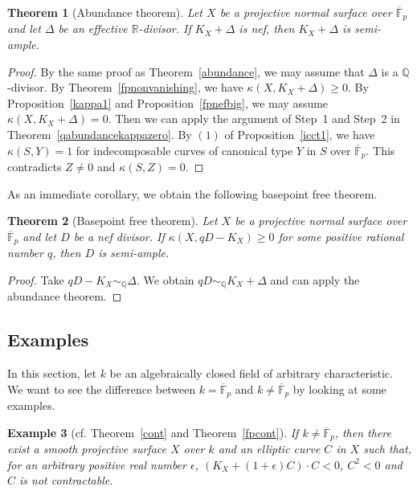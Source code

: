 \documentclass[12pt,twoside]{amsart}
\newtheorem{thm}{Theorem}[section]
\newtheorem{ex}[thm]{Example}
\theoremstyle{definition}
\newcommand{\Q}{$\mathbb{Q}$}
\newcommand{\fff}{\overline{\mathbb{F}}_p}
\begin{document}
\begin{thm}[Abundance theorem]\label{fpabundance}
Let $X$ be a projective normal surface over $\overline{\mathbb{F}}_p$ and 
let $\Delta$ be an effective $\mathbb{R}$-divisor.
If $K_X+\Delta$ is nef, then $K_X+\Delta$ is semi-ample. 
\end{thm}

\begin{proof}
By the same proof as Theorem~\ref{abundance}, 
we may assume that $\Delta$ is a \Q-divisor. 
By Theorem~\ref{fpnonvanishing}, we have $\kappa(X, K_X+\Delta)\geq 0$. 
By Proposition~\ref{kappa1} and Proposition~\ref{fpnefbig}, 
we may assume $\kappa(X, K_X+\Delta)=0$. 
Then we can apply the argument 
of Step~1 and Step~2 in Theorem~\ref{qabundancekappazero}. 
By $(1)$ of Proposition~\ref{icct1}, 
we have $\kappa(S, Y)=1$ for indecomposable curves of canonical type $Y$
in $S$ over $\overline{\mathbb{F}}_p$. 
This contradicts $Z\neq0$ and $\kappa(S, Z)=0$.
\end{proof}

As an immediate corollary, 
we obtain the following basepoint free theorem.

\begin{thm}[Basepoint free theorem]\label{fpbpf}
Let $X$ be a projective normal surface over $\overline{\mathbb{F}}_p$ and 
let $D$ be a nef divisor. 
If $\kappa(X, qD-K_X) \geq 0$ for some positive rational number $q$, 
then $D$ is semi-ample. 
\end{thm}

\begin{proof}
Take $qD-K_X \sim_{\mathbb{Q}} \Delta$.
We obtain $qD \sim_{\mathbb{Q}} K_X+\Delta$ 
and can apply the abundance theorem.
\end{proof}


\subsection{Examples}

In this section, 
let $k$ be an algebraically closed field of arbitrary characteristic. 
We want to see the difference 
between $k=\overline{\mathbb{F}}_p$ and $k\neq \overline{\mathbb{F}}_p$ 
by looking at some examples. 

\begin{ex}[cf. Theorem~\ref{cont} and Theorem~\ref{fpcont}]
If $k\neq\fff$, then 
there exist a smooth projective surface $X$ over $k$ 
and an elliptic curve $C$ in $X$ such that, 
for an arbitrary positive real number $\epsilon$, 
$(K_X+(1+\epsilon)C)\cdot C<0$, $C^2<0$ and 
$C$ is not contractable. 
\end{ex}
\end{document}
